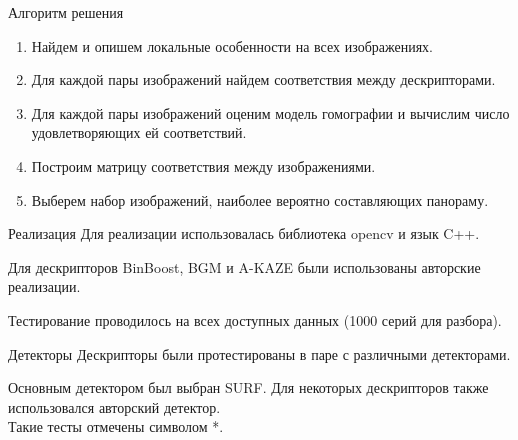 \documentclass[14pt,mathserif,aspectratio=43]{beamer}
\begin{document}
\begin{frame}{Алгоритм решения}
    \begin{enumerate}
    		\pause
			\item Найдем и опишем локальные особенности на всех изображениях.
			\pause
    		\item Для каждой пары изображений найдем соответствия между дескрипторами.
    		\pause
    		\item Для каждой пары изображений оценим модель гомографии и вычислим число удовлетворяющих ей соответствий.
    		\pause
    		\item Построим матрицу соответствия между изображениями.
    		\pause
    		\item Выберем набор изображений, наиболее вероятно составляющих панораму.

		\end{enumerate}
\end{frame}

\begin{frame}{Реализация}
    Для реализации использовалась библиотека opencv и язык C++. \\
    \pause
    \medskip

    Для дескрипторов BinBoost, BGM и A-KAZE были использованы авторские реализации. \\
    \pause
    \bigskip

    Тестирование проводилось на всех доступных данных (1000 серий для разбора). \\
\end{frame}

\begin{frame}{Детекторы}
    Дескрипторы были протестированы в паре с различными детекторами.
    \pause
    \bigskip

    Основным детектором был выбран SURF.
	\pause
	\bigskip
	\pause
	Для некоторых дескрипторов также использовался авторский детектор. \\
	Такие тесты отмечены символом *.

\end{frame}
\end{document}
